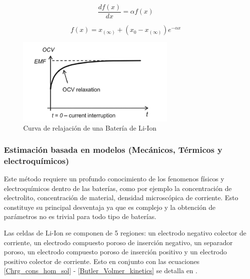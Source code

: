 \documentclass[10pt,a4paper]{article}
\begin{document}
\begin{equation}
    \frac{df(x)}{dx} = \alpha f(x)
    \label{1er_orden_eq}
\end{equation}  

\begin{equation}
    f(x)= x_{(\infty)}+(x_0-x_{(\infty)})e^{-\alpha x}
    \label{1er_orden_sol}
\end{equation}  

\clearpage

\begin{figure}[h]
    \begin{center}
	\includegraphics[width=0.7\textwidth]{EMF_Relaxation.png}
	\caption{Curva de relajación de una Batería de Li-Ion}
	\label{EMF_Method}
    \end{center}
\end{figure}

\subsubsection{Estimación basada en modelos (Mecánicos, Térmicos y electroquímicos)}

Este método requiere un profundo conocimiento de los fenomenos físicos y
electroquímicos dentro de las baterías, como por ejemplo la concentración de
electrolito, concentración de material, densidad microscópica de corriente. Esto
constituye su principal desventaja ya que es complejo y la obtención de
parámetros no es trivial para todo tipo de baterías.

Las celdas de Li-Ion se componen de 5 regiones: un electrodo negativo colector
de corriente, un electrodo compuesto poroso de inserción negativo, un separador
poroso, un electrodo compuesto poroso de inserción positivo y un electrodo
positivo colector de corriente. Esto en conjunto con las ecuaciones
\ref{Chrg_cons_hom_sol} - \ref{Butler_Volmer_kinetics} se detalla en
\cite{Li2016}.

\end{document}
